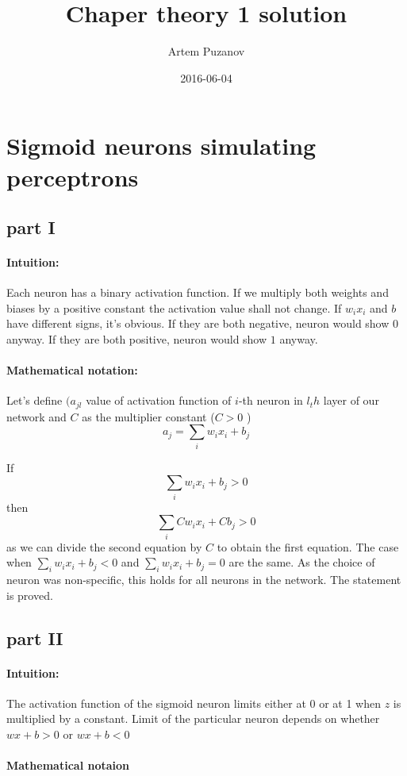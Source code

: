\documentclass{article}
\title{Chaper theory 1 solution}
\date{2016-06-04}
\author{Artem Puzanov}
\begin{document}
\maketitle
{}
\newpage
{}

\section{Sigmoid neurons simulating perceptrons}
\subsection{part I}
\paragraph{Intuition:} 
Each neuron has a binary activation function. If we multiply both weights and biases by a positive
constant the activation value shall not change. If $w_ix_i$ and $b$ have different signs, it's obvious.
If they are both negative, neuron would show $0$ anyway. If they are both positive, neuron would show
$1$ anyway.
\paragraph{Mathematical notation:} 
Let's define $(a_{jl}$ value of activation function of $i$-th neuron in $l_th$ layer of our network
and $C$ as the multiplier constant ($C > 0$ )
\begin{equation*}
  a_{j} = \sum_{i}w_ix_i + b_j
\end{equation*}

If $$\sum_{i}w_ix_i + b_j > 0$$ then $$\sum_{i}Cw_ix_i + Cb_j > 0$$ as we can divide the second equation by $C$
to obtain the first equation. The case when $\sum_{i}w_ix_i + b_j < 0$ and $\sum_{i}w_ix_i + b_j = 0$ are the same.
As the choice of neuron was non-specific, this holds for all neurons in the network. 
The statement is proved.

\subsection{part II}
\paragraph{Intuition:} 
The activation function of the sigmoid neuron limits either at 0 or at 1 when $z$
is multiplied by a constant. Limit of the particular neuron depends on whether $wx + b > 0$ or $wx + b < 0$
\paragraph{Mathematical notaion} 
\end{document}
